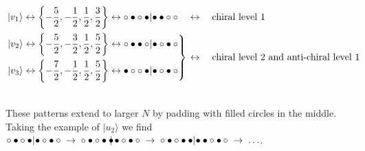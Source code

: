 \documentclass[a4paper,10pt]{article}
\newcommand{\linnea}[1]{$\framebox{\tiny L}$\ \textbf{\texttt{{\color{red}\footnotesize#1}}}}
\newcommand{\jesper}[1]{$\framebox{\tiny J}$\ \textbf{\texttt{{\color{cyan}\footnotesize#1}}}}
\begin{document}
\begin{equation}\label{p1states}
\begin{split}
| v_1 \rangle \leftrightarrow \left\{-\frac{5}{2},-\frac{1}{2},\frac{1}{2},\frac{3}{2}\right\} \leftrightarrow\circ\bullet\circ\bullet\hspace*{-2pt}|\hspace*{-2pt}\bullet\bullet\circ\circ  \quad &\leftrightarrow \quad\text{chiral level 1}\\
%
    \left.
     \begin{aligned}%
       | v_2\rangle \leftrightarrow \left\{-\frac{5}{2},-\frac{3}{2},\frac{1}{2},\frac{5}{2}\right\}& \leftrightarrow\circ\bullet\bullet\circ\hspace*{-2pt}|\hspace*{-2pt}\bullet\circ\bullet\circ \\
       | v_3\rangle \leftrightarrow\left\{-\frac{7}{2},-\frac{1}{2},\frac{1}{2},\frac{5}{2}\right\}& \leftrightarrow\bullet\circ\circ\bullet\hspace*{-2pt}|\hspace*{-2pt}\bullet\circ\bullet\circ \\
    \end{aligned}
    \right\}\hspace*{1pt}  &\leftrightarrow\quad \text{chiral level 2 and anti-chiral level 1} \hspace*{-10pt}\\
%
%
\end{split}
\end{equation}

~\\
These patterns extend to larger $N$ by padding with filled circles in the middle. Taking the example of $|u_2\rangle$ we find $\circ\bullet\circ\bullet\hspace*{-2pt}|\hspace*{-2pt}\bullet\circ\bullet\circ \; \rightarrow \; \circ\bullet\circ\bullet \bullet \hspace*{-4pt}|\bullet\circ\bullet\circ \; \rightarrow \; \circ\bullet\circ\bullet\bullet\hspace*{-0pt}|\hspace*{-2pt}\bullet\bullet\circ\bullet\hspace*{2pt}\circ \; \rightarrow \; \hdots$.
\end{document}

